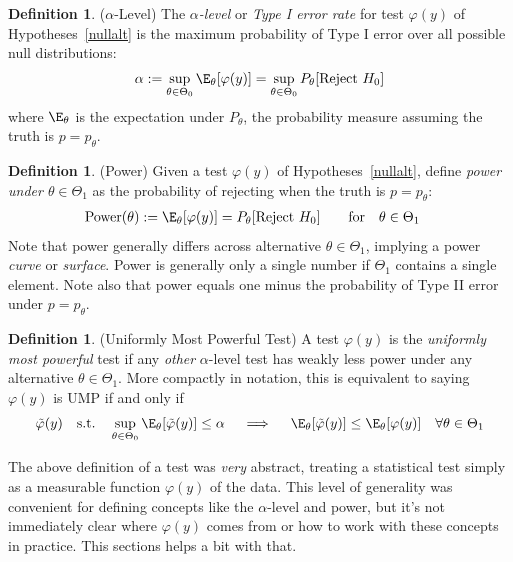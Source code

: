 \documentclass[12pt]{article}
\theoremstyle{plain}
\theoremstyle{definition}
\newtheorem{defn}[thm]{Definition}
\theoremstyle{remark}
\begin{document}
\begin{defn}($\alpha$-Level)
The \emph{$\alpha$-level} or \emph{Type I error rate} for test
$\varphi(y)$ of Hypotheses~\ref{nullalt} is the maximum probability of
Type I error over all possible null distributions:
\begin{align*}
  \alpha
  :=
  \sup_{\theta\in\Theta_0}
  \E_\theta[\varphi(y)]
  =
  \sup_{\theta\in\Theta_0}
  P_\theta[\text{Reject $H_0$}]
\end{align*}
where $\E_\theta$ is the expectation under $P_\theta$, the probability
measure assuming the truth is $p=p_\theta$.
\end{defn}

\begin{defn}(Power)
\label{defn:power}
Given a test $\varphi(y)$ of Hypotheses~\ref{nullalt}, define
\emph{power under $\theta\in\Theta_1$} as the probability of rejecting
when the truth is $p=p_\theta$:
\begin{align}
  \text{Power}(\theta)
  &:=
  \E_\theta[\varphi(y)]
  = P_\theta[\text{Reject $H_0$}]
  \label{power}
  \qquad \text{for}\quad
  \theta\in\Theta_1
\end{align}
Note that power generally differs across alternative
$\theta\in\Theta_1$, implying a power \emph{curve} or \emph{surface}.
Power is generally only a single number if $\Theta_1$ contains a single
element.
Note also that power equals one minus the probability of Type II error
under $p=p_\theta$.
\end{defn}

\begin{defn}(Uniformly Most Powerful Test)
A test $\varphi(y)$ is the \emph{uniformly most powerful} test if any
\emph{other} $\alpha$-level test has weakly less power under any
alternative $\theta\in\Theta_1$.
More compactly in notation, this is equivalent to saying
$\varphi(y)$ is UMP if and only if
\begin{align*}
  \tilde{\varphi}(y)
  \quad\text{s.t.}\quad
  \sup_{\theta\in\Theta_0}
  \E_\theta[\tilde{\varphi}(y)]
  \leq \alpha
  \quad\implies\quad
  \E_\theta[\tilde{\varphi}(y)]
  \leq
  \E_\theta[\varphi(y)]
  \quad
  \forall
  \theta\in\Theta_1
\end{align*}
\end{defn}
\clearpage

The above definition of a test was \emph{very} abstract, treating a
statistical test simply as a measurable function $\varphi(y)$ of the
data. This level of generality was convenient for defining concepts like
the $\alpha$-level and power, but it's not immediately clear where
$\varphi(y)$ comes from or how to work with these concepts in
practice. This sections helps a bit with that.
\end{document}
